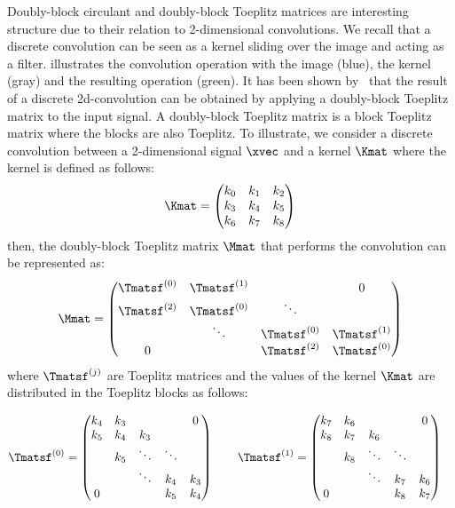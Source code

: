 Doubly-block circulant and doubly-block Toeplitz matrices are interesting structure due to their relation to 2-dimensional convolutions.
We recall that a discrete convolution can be seen as a kernel sliding over the image and acting as a filter.
 illustrates the convolution operation with the image (blue), the kernel (gray) and the resulting operation (green).
It has been shown by~\citet{jain1989fundamentals} that the result of a discrete 2d-convolution can be obtained by applying a doubly-block Toeplitz matrix to the input signal.
A doubly-block Toeplitz matrix is a block Toeplitz matrix where the blocks are also Toeplitz.
To illustrate, we consider a discrete convolution between a 2-dimensional signal $\xvec$ and a kernel $\Kmat$ where the kernel is defined as follows:
\begin{equation*}
  \Kmat = \leftmatrix
    k_0 & k_1 & k_2 \\
    k_3 & k_4 & k_5 \\
    k_6 & k_7 & k_8 
  \rightmatrix
\end{equation*}
then, the doubly-block Toeplitz matrix $\Mmat$ that performs the convolution can be represented as:
\begin{equation*}
  \Mmat = \leftmatrix
    \Tmatsf^{(0)} & \Tmatsf^{(1)} &             &  0          \\
    \Tmatsf^{(2)} & \Tmatsf^{(0)} & \ddots      &             \\
                  & \ddots        & \Tmatsf^{(0)} & \Tmatsf^{(1)} \\
    0             &               & \Tmatsf^{(2)} & \Tmatsf^{(0)}
  \rightmatrix
\end{equation*}
where $\Tmatsf^{(j)}$ are Toeplitz matrices and the values of the kernel $\Kmat$ are distributed in the Toeplitz blocks as follows:

\begin{equation*}
  \Tmatsf^{(0)} = \leftmatrix
    k_4 & k_3 &         &         & 0       \\
    k_5 & k_4 & k_3 &         &         \\
            & k_5 & \ddots  & \ddots  &         \\
            &         & \ddots  & k_4 & k_3 \\
    0       &         &         & k_5 & k_4
  \rightmatrix \quad \quad
  \hfill
  \Tmatsf^{(1)} = \leftmatrix
    k_7 & k_6 &         &         & 0       \\
    k_8 & k_7 & k_6 &         &         \\
            & k_8 & \ddots  & \ddots  &         \\
            &         & \ddots  & k_7 & k_6 \\
    0       &         &         & k_8 & k_7 \\
  \rightmatrix \quad
\end{equation*}

